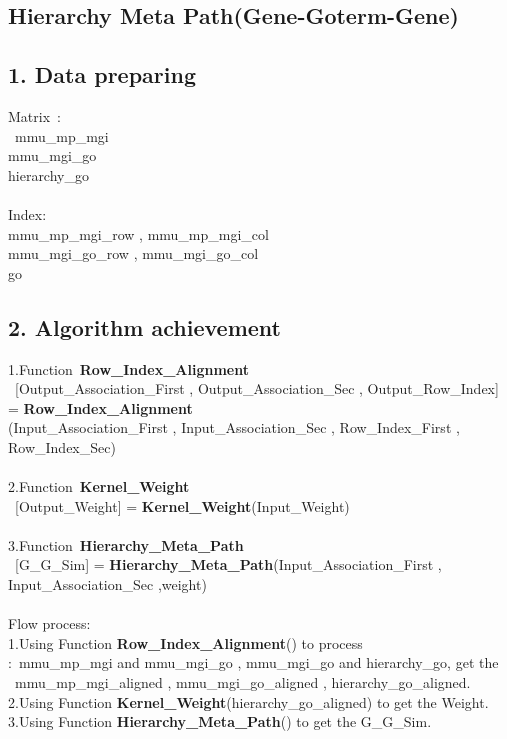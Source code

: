 \documentclass{ctexart}
\begin{document}
\setlength{\parindent}{0pt}
\begin{CJK}{GBK}{song}
\section*{Hierarchy Meta Path(Gene-Goterm-Gene)}
\subsection*{1. Data preparing}
Matrix\ :\\\ mmu\_mp\_mgi\\
mmu\_mgi\_go\\
hierarchy\_go\\\\
Index:\\mmu\_mp\_mgi\_row , mmu\_mp\_mgi\_col\\
mmu\_mgi\_go\_row , mmu\_mgi\_go\_col\\
go\\
\subsection*{2. Algorithm achievement}
1.Function\ \textbf{Row\_Index\_Alignment}\\
\ [Output\_Association\_First , Output\_Association\_Sec , Output\_Row\_Index] = \textbf{Row\_Index\_Alignment}\\
(Input\_Association\_First , Input\_Association\_Sec , Row\_Index\_First , Row\_Index\_Sec)\\\\
2.Function\ \textbf{Kernel\_Weight}\\
\ [Output\_Weight] = \textbf{Kernel\_Weight}(Input\_Weight)\\\\
3.Function\ \textbf{Hierarchy\_Meta\_Path}\\
\ [G\_G\_Sim] = \textbf{Hierarchy\_Meta\_Path}(Input\_Association\_First , Input\_Association\_Sec ,weight)\\\\

Flow process:\\
1.Using Function \textbf{Row\_Index\_Alignment}() to process \\
:\ mmu\_mp\_mgi and mmu\_mgi\_go , mmu\_mgi\_go and hierarchy\_go,
get the \ mmu\_mp\_mgi\_aligned , mmu\_mgi\_go\_aligned , hierarchy\_go\_aligned.\\
2.Using Function \textbf{Kernel\_Weight}(hierarchy\_go\_aligned) to get the Weight.\\
3.Using Function \textbf{Hierarchy\_Meta\_Path}() to get the G\_G\_Sim.\\

\end{CJK}
\end{document}
